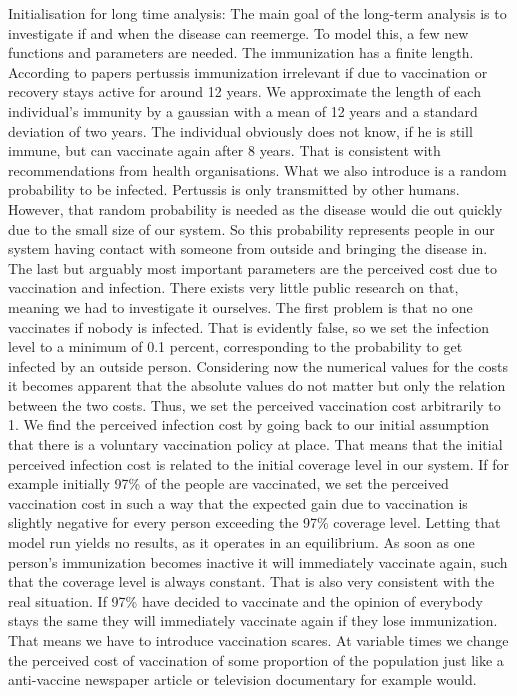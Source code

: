\documentclass[11pt]{article}
\begin{document}
Initialisation for long time analysis:
The main goal of the long-term analysis is to investigate if and when the disease can reemerge. To model this, a few new functions and parameters are needed. The immunization has a finite length. According to papers pertussis immunization irrelevant if due to vaccination or recovery stays active for around 12 years. We approximate the length of each individual’s immunity by a gaussian with a mean of 12 years and a standard deviation of two years. The individual obviously does not know, if he is still immune, but can vaccinate again after 8 years. That is consistent with recommendations from health organisations. What we also introduce is a random probability to be infected. Pertussis is only transmitted by other humans. However, that random probability is needed as the disease would die out quickly due to the small size of our system. So this probability represents people in our system having contact with someone from outside and bringing the disease in. The last but arguably most important parameters are the perceived cost due to vaccination and infection. There exists very little public research on that, meaning we had to investigate it ourselves. The first problem is that no one vaccinates if nobody is infected. That is evidently false, so we set the infection level to a minimum of 0.1 percent, corresponding to the probability to get infected by an outside person.
Considering now the numerical values for the costs it becomes apparent that the absolute values do not matter but only the relation between the two costs. Thus, we set the perceived vaccination cost arbitrarily to 1. We find the perceived infection cost by going back to our initial assumption that there is a voluntary vaccination policy at place. That means that the initial perceived infection cost is related to the initial coverage level in our system. If for example initially 97\% of the people are vaccinated, we set the perceived vaccination cost in such a way that the expected gain due to vaccination is slightly negative for every person exceeding the 97\% coverage level.
Letting that model run yields no results, as it operates in an equilibrium. As soon as one person’s immunization becomes inactive it will immediately vaccinate again, such that the coverage level is always constant. That is also very consistent with the real situation. If 97\% have decided to vaccinate and the opinion of everybody stays the same they will immediately vaccinate again if they lose immunization.
That means we have to introduce vaccination scares. At variable times we change the perceived cost of vaccination of some proportion of the population just like a anti-vaccine newspaper article or television documentary for example would.
\end{document}
